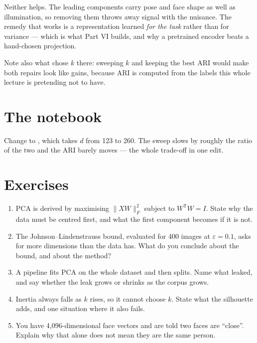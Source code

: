 \documentclass[11pt,a4paper]{article}
\begin{document}
Neither helps. The leading components carry pose and face shape as well as
illumination, so removing them throws away signal with the nuisance. The remedy
that works is a representation learned \emph{for the task} rather than for
variance --- which is what Part VI builds, and why a pretrained encoder beats a
hand-chosen projection.

Note also what chose $k$ there: sweeping $k$ and keeping the best ARI would
make both repairs look like gains, because ARI is computed from the labels this
whole lecture is pretending not to have.

\section{The notebook}

\begin{trybox}[title={What to change}]
Change  to , which takes $d$ from 123 to
260. The sweep slows by roughly the ratio of the two and the ARI barely moves
--- the whole trade-off in one edit.
\end{trybox}

\section{Exercises}

\begin{enumerate}[leftmargin=1.6em,itemsep=4pt]
  \item PCA is derived by maximising $\lVert XW\rVert_F^2$ subject to
        $W^{\mathsf T}W = I$. State why the data must be centred first, and
        what the first component becomes if it is not. \hfill \scope{[5]}
  \item The Johnson--Lindenstrauss bound, evaluated for 400 images at
        $\varepsilon = 0.1$, asks for more dimensions than the data has. What
        do you conclude about the bound, and about the method?
        \hfill \scope{[5]}
  \item A pipeline fits PCA on the whole dataset and then splits. Name what
        leaked, and say whether the leak grows or shrinks as the corpus grows.
        \hfill \scope{[4]}
  \item Inertia always falls as $k$ rises, so it cannot choose $k$. State what
        the silhouette adds, and one situation where it also fails.
        \hfill \scope{[5]}
  \item You have 4{,}096-dimensional face vectors and are told two faces are
        ``close''. Explain why that alone does not mean they are the same
        person. \hfill \scope{[4]}
\end{enumerate}
\end{document}
